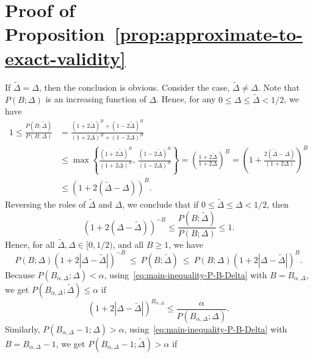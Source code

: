 \documentclass{article}
\newcommand{\clr}{\color{black}}
\numberwithin{myalgctr}{section}
\begin{document}
\section{Proof of Proposition~\ref{prop:approximate-to-exact-validity}}\label{appsec:approximate-to-exact-validity}
If $\widetilde{\Delta} = \Delta$, then the conclusion is obvious. Consider the case, $\widetilde{\Delta} \neq \Delta$.
Note that $P(B; \Delta)$ is an increasing function of $\Delta$. Hence, for any $0 \le \Delta \le \widetilde{\Delta} < 1/2$, we have
\begin{equation}\label{eq:simple-ratio-inequality}
\begin{split}
1 \le \frac{P(B; \widetilde{\Delta})}{P(B; \Delta)} &= \frac{(1 + 2\widetilde{\Delta})^B + (1 - 2\widetilde{\Delta})^B}{(1 + 2\Delta)^B + (1 - 2\Delta)^B}\\
&\le \max\left\{\frac{(1 + 2\widetilde{\Delta})^B}{(1 + 2\Delta)^B},\,\frac{(1 - 2\widetilde{\Delta})^B}{(1 - 2\Delta)^B}\right\} = \left(\frac{1 + 2\widetilde{\Delta}}{1 + 2\Delta}\right)^B = \left(1 + \frac{2(\widetilde{\Delta} - \Delta)}{(1 + 2\Delta)}\right)^B\\ 
&\le \left(1 + 2(\widetilde{\Delta} - \Delta)\right)^B.
\end{split}
\end{equation}
Reversing the roles of $\widetilde{\Delta}$ and $\Delta$, we conclude that if $0 \le \widetilde{\Delta} \le \Delta < 1/2$, then
\[
\left(1 + 2(\Delta - \widetilde{\Delta})\right)^{-B} \le \frac{P(B; \widetilde{\Delta})}{P(B; \Delta)} \le 1.
\]
Hence, for all $\widetilde{\Delta}, \Delta\in[0,1/2)$, and all $B\ge1$, we have
\begin{equation}\label{eq:main-inequality-P-B-Delta}
P(B; \Delta)\left(1 + 2|\Delta - \widetilde{\Delta}|\right)^{-B} ~\le~ P(B; \widetilde{\Delta}) ~\le~ P(B; \Delta)\left(1 + 2|\Delta - \widetilde{\Delta}|\right)^B. 
\end{equation}
Because $P(B_{\alpha,\Delta};\Delta) < \alpha$, using~\eqref{eq:main-inequality-P-B-Delta} with $B = B_{\alpha,\Delta}$, we get $P(B_{\alpha,\Delta}; \widetilde{\Delta}) \le \alpha$ if
\begin{equation}\label{eq:upper-bound}
\left(1 + 2|\Delta - \widetilde{\Delta}|\right)^{B_{\alpha,\Delta}} \le \frac{\alpha}{P(B_{\alpha,\Delta}; \Delta)}.
\end{equation}
Similarly, $P(B_{\alpha,\Delta} - 1; \Delta) > \alpha$, using~\eqref{eq:main-inequality-P-B-Delta} with $B = B_{\alpha,\Delta} - 1$, we get $P(B_{\alpha,\Delta} - 1; \widetilde{\Delta}) > \alpha$ if
\end{document}
